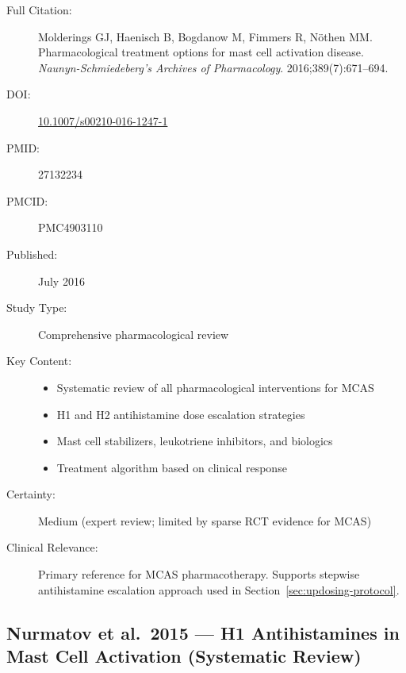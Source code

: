 \begin{description}
    \item[Full Citation:] Molderings GJ, Haenisch B, Bogdanow M, Fimmers R, N{\"o}then MM. Pharmacological treatment options for mast cell activation disease. \textit{Naunyn-Schmiedeberg's Archives of Pharmacology}. 2016;389(7):671--694.
    \item[DOI:] \href{https://doi.org/10.1007/s00210-016-1247-1}{10.1007/s00210-016-1247-1}
    \item[PMID:] 27132234
    \item[PMCID:] PMC4903110
    \item[Published:] July 2016
    \item[Study Type:] Comprehensive pharmacological review
    \item[Key Content:]
    \begin{itemize}
        \item Systematic review of all pharmacological interventions for MCAS
        \item H1 and H2 antihistamine dose escalation strategies
        \item Mast cell stabilizers, leukotriene inhibitors, and biologics
        \item Treatment algorithm based on clinical response
    \end{itemize}
    \item[Certainty:] Medium (expert review; limited by sparse RCT evidence for MCAS)
    \item[Clinical Relevance:] Primary reference for MCAS pharmacotherapy. Supports stepwise antihistamine escalation approach used in Section~\ref{sec:updosing-protocol}.
\end{description}

\subsection{Nurmatov et al.\ 2015 --- H1 Antihistamines in Mast Cell Activation (Systematic Review)}

